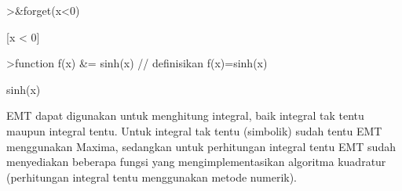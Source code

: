 \documentclass[a4paper,10pt]{article}
\begin{document}
\begin{eulernotebook}
\begin{eulercomment}
\begin{eulercomment}
\begin{eulercomment}
\begin{eulercomment}
\begin{eulercomment}
\begin{eulercomment}
\begin{eulercomment}
\begin{eulercomment}
\begin{euleroutput}
                                 [x > 0]
  
\end{euleroutput}
\begin{eulerprompt}
>&forget(x<0)
\end{eulerprompt}
\begin{euleroutput}
  
                                 [x < 0]
  
\end{euleroutput}
\begin{eulerprompt}
>function f(x) &= sinh(x) // definisikan f(x)=sinh(x)
\end{eulerprompt}
\begin{euleroutput}
  
                                 sinh(x)
  
\end{euleroutput}
\begin{eulercomment}
EMT dapat digunakan untuk menghitung integral, baik integral tak tentu
maupun integral tentu. Untuk integral tak tentu (simbolik) sudah tentu
EMT menggunakan Maxima, sedangkan untuk perhitungan integral tentu EMT
sudah menyediakan beberapa fungsi yang mengimplementasikan algoritma
kuadratur (perhitungan integral tentu menggunakan metode numerik).


\end{eulercomment}
\end{eulercomment}
\end{eulercomment}
\end{eulercomment}
\end{eulercomment}
\end{eulercomment}
\end{eulercomment}
\end{eulercomment}
\end{eulercomment}
\end{eulernotebook}
\end{document}
